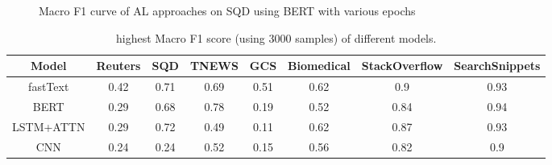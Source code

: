 \begin{enumerate}
\begin{figure}[th!]%

	\noindent
	\begin{center}
	\end{center}
	\caption{Macro F1 curve of AL approaches on SQD using BERT with various epochs}
	\label{fig:bert_5_epoch}
\end{figure}

\begin{table}[th]
	\scriptsize
	\centering
	\begin{tabular}{cccccccc}
		\toprule
		Model & Reuters    & SQD   & TNEWS   & GCS& Biomedical & StackOverflow & SearchSnippets\\ \hline
		fastText & 0.42 & 0.71 & 0.69 & 0.51 & 0.62 & 0.9 & 0.93\\
		BERT & 0.29 & 0.68 & 0.78 & 0.19 & 0.52 & 0.84 & 0.94\\
		LSTM+ATTN & 0.29 & 0.72 & 0.49 & 0.11 & 0.62 & 0.87 & 0.93\\
		CNN & 0.24 & 0.24 & 0.52 & 0.15 & 0.56 & 0.82 & 0.9\\
		\bottomrule
	\end{tabular}
	\caption{highest Macro F1 score (using 3000 samples) of different models.}
	\label{table:upperbound_3000}
\end{table}


\end{enumerate}
